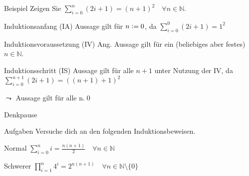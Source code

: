 \begin{frame}[fragile]{Beispiel}
Zeigen Sie $\displaystyle\sum_{i = 0}^{n} (2i+1) = (n+1)^2 \quad\forall n \in\mathbb{N}$.
\begin{alertblock}{Induktionsanfang (IA)}
    Aussage gilt für $n\vcentcolon=0$, da $\sum_{i = 0}^{0} (2i+1) = 1^2$
\end{alertblock}
\begin{alertblock}{Induktionsvoraussetzung (IV)}
    Ang. Aussage gilt für ein (beliebiges aber festes) $n \in\mathbb{N}$.
\end{alertblock}
\begin{alertblock}{Induktionsschritt (IS)}
    Aussage gilt für alle $n+1$ unter Nutzung der IV, da\\
    $\sum_{i = 0}^{n+1} (2i+1) = ((n+1)+1)^2$
\end{alertblock}
\alert{$\leadsto$ Aussage gilt für alle n.}\qed
\end{frame}


{
\begin{frame}[fragile]{Denkpause}
    \begin{alertblock}{Aufgaben}
    Versuche dich an den folgenden Induktionsbeweisen.
    \end{alertblock}

    \begin{block}{Normal}
        $\displaystyle\sum_{i=0}^{n} i = \frac{n(n+1)}{2} \quad \forall n \in \mathbb{N}$
    \end{block}
    \begin{block}{Schwerer}
        $\displaystyle\prod_{i=1}^{n} 4^i = 2^{n(n+1)} \quad \forall n \in \mathbb{N}\setminus \{0\}$
    \end{block}
\end{frame}
}

